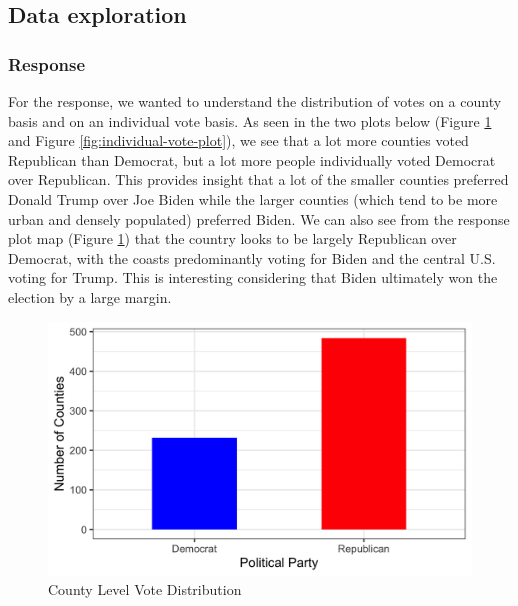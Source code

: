 \documentclass[
]{article}
\begin{document}
\hypertarget{data-exploration}{%
\subsection{Data exploration}\label{data-exploration}}

\hypertarget{response}{%
\subsubsection{Response}\label{response}}

For the response, we wanted to understand the distribution of votes on a county basis and on an individual vote basis. As seen in the two plots below (Figure \ref{fig:county-level-vote-plot} and Figure \ref{fig:individual-vote-plot}), we see that a lot more counties voted Republican than Democrat, but a lot more people individually voted Democrat over Republican. This provides insight that a lot of the smaller counties preferred Donald Trump over Joe Biden while the larger counties (which tend to be more urban and densely populated) preferred Biden. We can also see from the response plot map (Figure \ref{fig:county-level-vote-plot}) that the country looks to be largely Republican over Democrat, with the coasts predominantly voting for Biden and the central U.S. voting for Trump. This is interesting considering that Biden ultimately won the election by a large margin.

\begin{figure}

{\centering \includegraphics[width=0.8\linewidth]{../results/response-plot} 

}

\caption{County Level Vote Distribution}\label{fig:county-level-vote-plot}
\end{figure}
\end{document}

